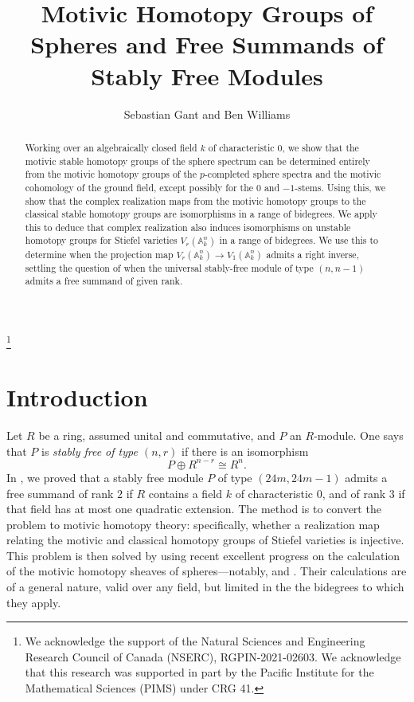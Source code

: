 \documentclass[11pt, oneside, dvipsnames, svgnames, table, final]{amsart}
\author{Sebastian Gant and Ben Williams}
\newcommand{\mathbx}[1]{\mathbb{#1}}
\theoremstyle{plain}
\theoremstyle{definition}
\theoremstyle{remark}
\newcommand{\A}{\mathbx{A}}
\newcommand{\isom}{\cong}
\newcommand{\iso}{\isom}
\newcommand{\<}[1]{{\langle}#1 {\rangle}}
\begin{document}
\title{Motivic Homotopy Groups of Spheres and Free Summands of Stably Free Modules}

\begin{abstract}
  Working over an algebraically closed field $k$ of characteristic $0$, we show that the motivic stable homotopy groups of the sphere spectrum can be determined entirely from the motivic homotopy groups of the $p$-completed sphere spectra and the motivic cohomology of the ground field, except possibly for the $0$ and $-1$-stems. Using this, we show that the complex realization maps from the motivic homotopy groups to the classical stable homotopy groups are isomorphisms in a range of bidegrees. We apply this to deduce that complex realization also induces isomorphisms on unstable homotopy groups for Stiefel varieties $V_r(\A^n_k)$ in a range of bidegrees. We use this to determine when the projection map $V_r(\A^n_k) \to V_1(\A^n_k)$ admits a right inverse, settling the question of when the universal stably-free module of type $(n,n-1)$ admits a free summand of given rank.
\end{abstract}
\thanks{We acknowledge the support of the Natural Sciences and Engineering Research Council of Canada (NSERC), RGPIN-2021-02603. We acknowledge that this research was supported in part by the Pacific Institute for the Mathematical Sciences (PIMS) under CRG 41.}


\maketitle


\section{Introduction}
\label{sec:introduction}

Let $R$ be a ring, assumed unital and commutative, and $P$ an $R$-module. One says that $P$ is \emph{stably free of type $(n,r)$} if there is an isomorphism
\[ P \oplus R^{n-r} \iso R^n. \]
In \cite{Gant2025}, we proved that a stably free module $P$ of type $(24m,24m-1)$ admits a free summand of rank $2$ if $R$ contains a field $k$ of characteristic $0$, and of rank $3$ if that field has at most one quadratic extension. The method is to convert the problem to motivic homotopy theory: specifically, whether a realization map relating the motivic and classical homotopy groups of Stiefel varieties is injective. This problem is then solved by using recent excellent progress on the calculation of the motivic homotopy sheaves of spheres---notably, \cite{Rondigs2019} and \cite{Rondigs2024}. Their calculations are of a general nature, valid over any field, but limited in the the bidegrees to which they apply.
\end{document}
